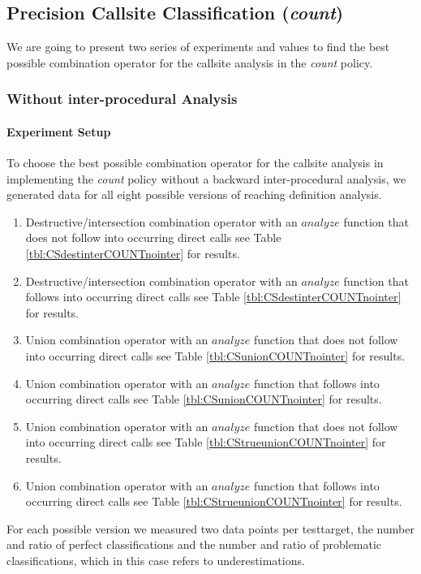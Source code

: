 \newpage

\subsection{Precision Callsite Classification (\textit{count})}
\label{subsection:typeshieldprecision}
We are going to present two series of experiments and values to find the best possible combination operator for the callsite analysis in the \textit{count} policy.
\subsubsection{Without inter-procedural Analysis}

\paragraph{Experiment Setup}
To choose the best possible combination operator for the callsite analysis in implementing the \textit{count} policy without a backward inter-procedural analysis, we generated data for all eight possible versions of reaching definition analysis.
\begin{enumerate}
\item Destructive/intersection combination operator with an $analyze$ function that does not follow into occurring direct calls see Table \ref{tbl:CSdestinterCOUNTnointer} for results.
\item Destructive/intersection combination operator with an $analyze$ function that follows into occurring direct calls see Table \ref{tbl:CSdestinterCOUNTnointer} for results.
\item Union combination operator with an $analyze$ function that does not follow into occurring direct calls see Table \ref{tbl:CSunionCOUNTnointer} for results.
\item Union combination operator with an $analyze$ function that follows into occurring direct calls see Table \ref{tbl:CSunionCOUNTnointer} for results.
\item Union combination operator with an $analyze$ function that does not follow into occurring direct calls see Table \ref{tbl:CStrueunionCOUNTnointer} for results.
\item Union combination operator with an $analyze$ function that follows into occurring direct calls see Table \ref{tbl:CStrueunionCOUNTnointer} for results.
\end{enumerate}
For each possible version we measured two data points per testtarget, the number and ratio of perfect classifications and the number and ratio of problematic classifications, which in this case refers to underestimations.


